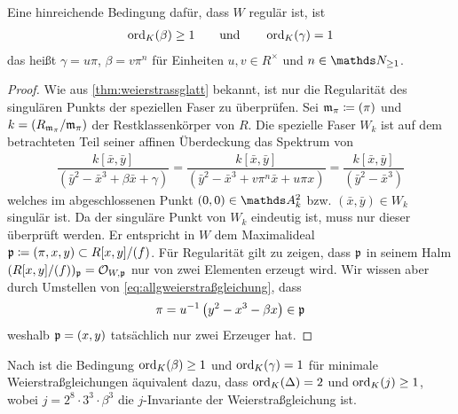 \begin{Korollar}\label{thm:c1red}
  \label{bem:bedregweierstraßmodell}
  Eine hinreichende Bedingung dafür, dass $W$ regulär ist, ist
  \begin{gather*}
    \operatorname{ord}_{K}(\beta)\geq 1
    \qquad\text{und}\qquad
    \operatorname{ord}_{K}(\gamma)=1
  \end{gather*}
  das heißt $\gamma=u\pi$, $\beta=v\pi^n$ für Einheiten $u,v\in R^\times$
  und $n\in\N_{\geq1}$.

  \begin{proof}
    Wie aus \ref{thm:weierstrassglatt} bekannt, ist nur die
    Regularität des singulären Punkts der speziellen Faser zu
    überprüfen.
    Sei $\mathfrak{m}_\pi\coloneqq(\pi)$ und $k=(R_{\mathfrak{m}_\pi}/\mathfrak{m}_\pi)$ der
    Restklassenkörper von $R$.
    Die spezielle Faser $W_k$ ist auf dem betrachteten Teil seiner
    affinen Überdeckung das Spektrum von 
    \begin{gather*}
      \dfrac{k[\bar x,\bar y]}{(\bar y^2-\bar x^3+\beta \bar x+\gamma)}
      =\dfrac{k[\bar x,\bar y]}{(\bar y^2-\bar x^3+v\pi^n \bar x+u\pi x)}
      =\dfrac{k[\bar x,\bar y]}{(\bar y^2-\bar x^3)}
    \end{gather*}
    welches im abgeschlossenen Punkt $(0,0)\in\A_k^2$ bzw.
    $(\bar x,\bar y)\in W_k$ singulär ist. Da der singuläre Punkt von
    $W_k$ eindeutig ist, muss nur dieser überprüft werden.
    Er entspricht in $W$ dem Maximalideal
    $\mathfrak{p}\coloneqq(\pi,x,y)\subset R[x,y]/(f)$.
    Für Regularität gilt zu zeigen, dass $\mathfrak{p}$ in seinem Halm
    $(R[x,y]/(f))_{\mathfrak{p}}=\mathcal{O}_{W,\mathfrak{p}}$ nur von zwei Elementen erzeugt wird.
    Wir wissen aber durch Umstellen von
    \eqref{eq:allgweierstraßgleichung}, dass
    \begin{gather*}
      \pi = u^{-1}\left( y^2-x^3-\beta x \right)\in\mathfrak{p}
    \end{gather*}
    weshalb $\mathfrak{p}=(x,y)$ tatsächlich nur zwei Erzeuger hat.
  \end{proof}
\end{Korollar}

\begin{Bemerkung}
Nach \cite[Chapter 1.5, Lemma 3 and Lemma 4]{neron} ist die
Bedingung $\operatorname{ord}_{K}(\beta)\geq 1$ und $\operatorname{ord}_{K}(\gamma)=1$ für
minimale Weierstraßgleichungen äquivalent dazu,
dass $\operatorname{ord}_{K}(\Delta)=2$ und $\operatorname{ord}_{K}(j)\geq 1$,
wobei $j=2^8\cdot 3^3\cdot\beta^3$ die $j$-Invariante der
Weierstraßgleichung ist.
\end{Bemerkung}

